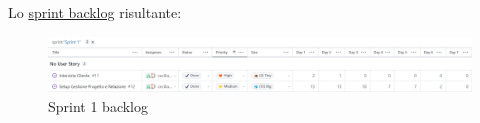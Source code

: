 Lo \href{https://github.com/orgs/ISIQuiz/projects/3/}{sprint backlog} risultante:
\begin{figure}[H]
    \centering
    \includegraphics[width=\textwidth]{process/Img/Sprint1BL.jpg}
    \caption{Sprint 1 backlog}
    \label{fig:Sprint1}
\end{figure}

